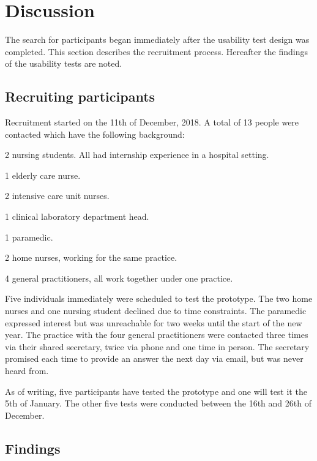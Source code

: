 \section{Discussion}\label{discussion}

The search for participants began immediately after the usability test design was completed. This section describes the recruitment process. Hereafter the findings of the usability tests are noted.

    \subsection{Recruiting participants}

    Recruitment started on the 11th of December, 2018. A total of 13 people were contacted which have the following background:
    \vspace{-6pt}
    \begin{myitemize}
        \item 2 nursing students. All had internship experience in a hospital setting.
        \item 1 elderly care nurse.
        \item 2 intensive care unit nurses.
        \item 1 clinical laboratory department head.
        \item 1 paramedic.
        \item 2 home nurses, working for the same practice.
        \item 4 general practitioners, all work together under one practice.
    \end{myitemize}

    \noindent Five individuals immediately were scheduled to test the prototype. The two home nurses and one nursing student declined due to time constraints. The paramedic expressed interest but was unreachable for two weeks until the start of the new year. The practice with the four general practitioners were contacted three times via their shared secretary, twice via phone and one time in person. The secretary promised each time to provide an answer the next day via email, but was never heard from.

    As of writing, five participants have tested the prototype and one will test it the 5th of January. The other five tests were conducted between the 16th and 26th of December.

    \subsection{Findings}

